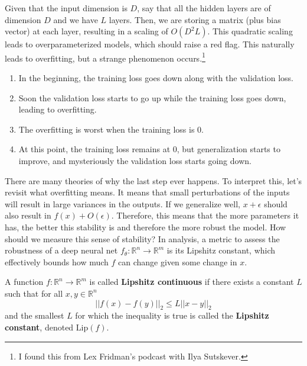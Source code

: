   Given that the input dimension is $D$, say that all the hidden layers are of dimension $D$ and we have $L$ layers. Then, we are storing a matrix (plus bias vector) at each layer, resulting in a scaling of $O(D^2 L)$. This quadratic scaling leads to overparameterized models, which should raise a red flag. This naturally leads to overfitting, but a strange phenomenon occurs.\footnote{I found this from Lex Fridman's podcast with Ilya Sutskever.}  
  \begin{enumerate}
    \item In the beginning, the training loss goes down along with the validation loss. 
    \item Soon the validation loss starts to go up while the training loss goes down, leading to overfitting. 
    \item The overfitting is worst when the training loss is $0$. 
    \item At this point, the training loss remains at $0$, but generalization starts to improve, and mysteriously the validation loss starts going down. 
  \end{enumerate}

  There are many theories of why the last step ever happens. To interpret this, let's revisit what overfitting means. It means that small perturbations of the inputs will result in large variances in the outputs. If we generalize well, $x + \epsilon$ should also result in $f(x) + O(\epsilon)$. Therefore, this means that the more parameters it has, the better this stability is and therefore the more robust the model. How should we measure this sense of stability? In analysis, a metric to assess the robustness of a deep neural net $f_\theta: \mathbb{R}^n \longrightarrow \mathbb{R}^m$ is its Lipshitz constant, which effectively bounds how much $f$ can change given some change in $x$. 

  \begin{definition}
    A function $f: \mathbb{R}^n \longrightarrow \mathbb{R}^m$ is called \textbf{Lipshitz continuous} if there exists a constant $L$ such that for all $x, y \in \mathbb{R}^n$
    \begin{equation}
      ||f(x) - f(y)||_2 \leq L ||x - y||_2
    \end{equation}
    and the smallest $L$ for which the inequality is true is called the \textbf{Lipshitz constant}, denoted $\mathrm{Lip}(f)$. 
  \end{definition}

